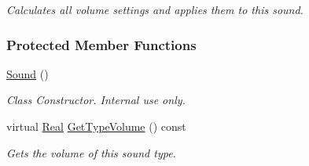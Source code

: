 \begin{DoxyCompactItemize}
\begin{DoxyCompactList}\small\item\em Calculates all volume settings and applies them to this sound. \item\end{DoxyCompactList}\end{DoxyCompactItemize}
\subsubsection*{Protected Member Functions}
\begin{DoxyCompactItemize}
\item 
\hypertarget{classMezzanine_1_1Audio_1_1Sound_a4cc742a744facfc9f408f0deb28d7a0d}{
\hyperlink{classMezzanine_1_1Audio_1_1Sound_a4cc742a744facfc9f408f0deb28d7a0d}{Sound} ()}
\label{classMezzanine_1_1Audio_1_1Sound_a4cc742a744facfc9f408f0deb28d7a0d}

\begin{DoxyCompactList}\small\item\em Class Constructor. Internal use only. \item\end{DoxyCompactList}\item 
\hypertarget{classMezzanine_1_1Audio_1_1Sound_a534ecdd7cf8780f68377be655c37b6c0}{
virtual \hyperlink{namespaceMezzanine_a726731b1a7df72bf3583e4a97282c6f6}{Real} \hyperlink{classMezzanine_1_1Audio_1_1Sound_a534ecdd7cf8780f68377be655c37b6c0}{GetTypeVolume} () const }
\label{classMezzanine_1_1Audio_1_1Sound_a534ecdd7cf8780f68377be655c37b6c0}

\begin{DoxyCompactList}\small\item\em Gets the volume of this sound type. \item\end{DoxyCompactList}\end{DoxyCompactItemize}
